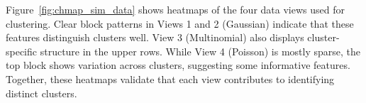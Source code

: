 Figure~\ref{fig:chmap_sim_data} shows heatmaps of the four data views used for clustering. 
Clear block patterns in Views 1 and 2 (Gaussian) indicate that these features distinguish clusters well. 
View 3 (Multinomial) also displays cluster-specific structure in the upper rows. 
While View 4 (Poisson) is mostly sparse, the top block shows variation across clusters, suggesting some informative features. 
Together, these heatmaps validate that each view contributes to identifying distinct clusters.

